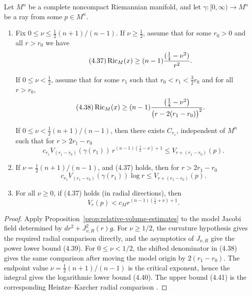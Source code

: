 \begin{theorem}
\label{thm:asymptotic-ricci-volume-growth}

Let $M^n$ be a complete noncompact Riemannian manifold, and let
$\gamma:[0,\infty)\to M^n$ be a ray from some $p\in M^n$.
\begin{enumerate}
\item[(i)] Fix $0\le \nu\le \tfrac12(n+1)/(n-1)$. If $\nu\ge \tfrac12$, assume
that for some $r_0>0$ and all $r>r_0$ we have
\begin{equation}
\tag{4.37}
\operatorname{Ric}_M(x)\ge (n-1)\frac{(\frac14-\nu^2)}{r^2}.
\end{equation}

If $0 \leq \nu < \frac12$, assume that for some $r_1$ such that $r_0 < r_1 <
\frac32 r_0$ and for all $r > r_0$,
\begin{equation}\tag{4.38}
\operatorname{Ric}_M(x) \geq (n-1)\frac{\left(\frac14-\nu^2\right)}{\bigl(r-2(r_1-r_0)\bigr)^2}.
\end{equation}

If $0 \leq \nu < \frac12 (n+1)/(n-1)$, then there exists $C_{r_1}$,
independent of $M^n$ such that for $r > 2r_1-r_0$
\begin{equation}\tag{4.39}
c_{r_1}V_{(r_1-r_0)}(\gamma(r_1))\,r^{(n-1)(\frac12-\nu)+1} \leq V_{r+(r_1-r_0)}(p).
\end{equation}

\item[(ii)] If $\nu = \frac12 (n+1)/(n-1)$, and (4.37) holds, then for
$r > 2r_1-r_0$
\begin{equation}\tag{4.40}
c_{r_1}V_{(r_1-r_0)}(\gamma(r_1))\log r \leq V_{r+(r_1-r_0)}(p).
\end{equation}

\item[(iii)] For all $\nu \geq 0$, if (4.37) holds (in radial directions), then
\begin{equation}\tag{4.41}
V_r(p) < c_M r^{(n-1)(\frac12+\nu)+1}.
\end{equation}
\end{enumerate}
\end{theorem}

\begin{proof}
\sketch Apply Proposition~\ref{prop:relative-volume-estimates} to the model
Jacobi field determined by $dr^2+J_{\nu,R}^2(r)g$. For $\nu\geq 1/2$, the
curvature hypothesis gives the required radial comparison directly, and the
asymptotics of $J_{\nu,R}$ give the power lower bound (4.39). For
$0\leq\nu<1/2$, the shifted denominator in (4.38) gives the same comparison
after moving the model origin by $2(r_1-r_0)$. The endpoint value
$\nu=\frac12(n+1)/(n-1)$ is the critical exponent, hence the integral gives the
logarithmic lower bound (4.40). The upper bound (4.41) is the corresponding
Heintze--Karcher radial comparison \cite{cgt-heintze-karcher}.
\end{proof}

